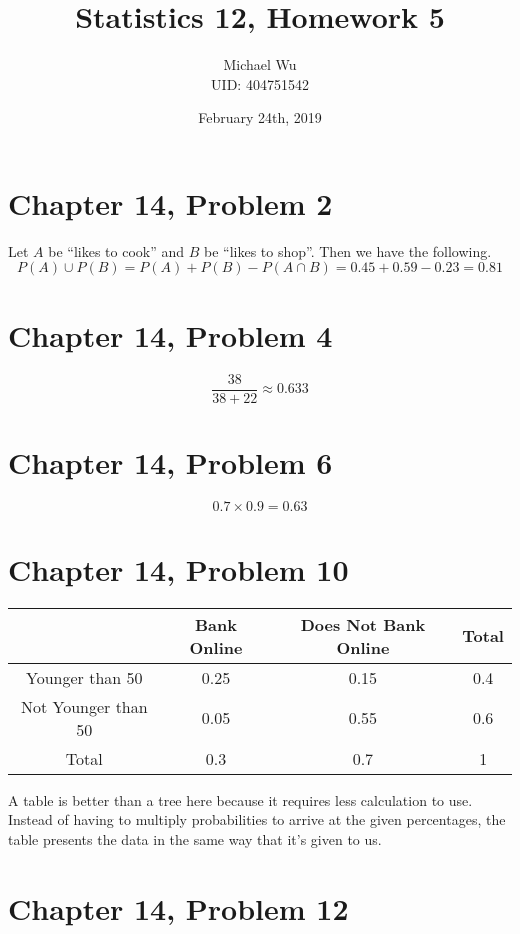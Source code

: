 \documentclass[12pt]{article}
\begin{document}
\title{Statistics 12, Homework 5}
\date{February 24th, 2019}
\author{Michael Wu\\UID: 404751542}
\maketitle

\section*{Chapter 14, Problem 2}

Let \(A\) be ``likes to cook'' and \(B\) be ``likes to shop''. Then we have the following.
\[P(A)\cup P(B) = P(A) + P(B) - P(A\cap B)=0.45 + 0.59 - 0.23=0.81\]

\section*{Chapter 14, Problem 4}

\[\frac{38}{38+22}\approx0.633\]

\section*{Chapter 14, Problem 6}

\[0.7\times0.9=0.63\]

\section*{Chapter 14, Problem 10}

\begin{center}
    \begin{tabular}{c|cc|c}
        & Bank Online & Does Not Bank Online & Total\\
        \hline
        Younger than 50 & 0.25 & 0.15 & 0.4\\
        Not Younger than 50 & 0.05 & 0.55 & 0.6\\
        \hline
        Total & 0.3 & 0.7 & 1
    \end{tabular}
\end{center}
A table is better than a tree here because it requires less calculation to use. Instead of having
to multiply probabilities to arrive at the given percentages, the table presents the data
in the same way that it's given to us.

\section*{Chapter 14, Problem 12}
\end{document}
